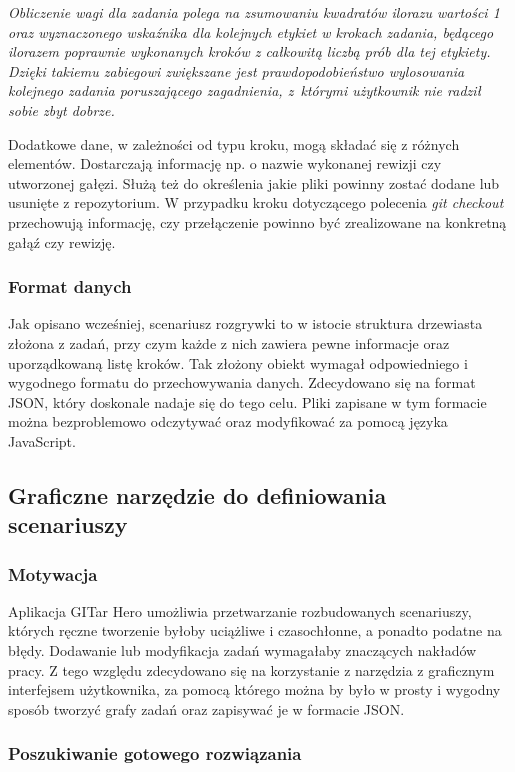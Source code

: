 \documentclass[11pt,a4paper,polish,thesis]{dcsbook}
\begin{document}
	\textit{Obliczenie wagi dla zadania polega na zsumowaniu kwadratów ilorazu wartości 1 oraz wyznaczonego wskaźnika dla kolejnych etykiet w krokach zadania, będącego ilorazem poprawnie wykonanych kroków z całkowitą liczbą prób dla tej etykiety. Dzięki takiemu zabiegowi zwiększane jest prawdopodobieństwo wylosowania kolejnego zadania poruszającego zagadnienia, z~którymi użytkownik nie radził sobie zbyt dobrze.}
	
	Dodatkowe dane, w zależności od typu kroku, mogą składać się z różnych elementów. Dostarczają informację np. o nazwie wykonanej rewizji czy utworzonej gałęzi. Służą też do określenia jakie pliki powinny zostać dodane lub usunięte z repozytorium. W przypadku kroku dotyczącego polecenia \textit{git checkout} przechowują informację, czy przełączenie powinno być zrealizowane na konkretną gałąź czy rewizję.
	
	\subsubsection{Format danych}
	
	Jak opisano wcześniej, scenariusz rozgrywki to w istocie struktura drzewiasta złożona z zadań, przy czym każde z nich zawiera pewne informacje oraz uporządkowaną listę kroków. Tak złożony obiekt wymagał odpowiedniego i wygodnego formatu do przechowywania danych. Zdecydowano się na format JSON, który doskonale nadaje się do tego celu. Pliki zapisane w tym formacie można bezproblemowo odczytywać oraz modyfikować za pomocą języka JavaScript.
	
	\subsection{Graficzne narzędzie do definiowania scenariuszy}
	
	\subsubsection{Motywacja}
	
	Aplikacja GITar Hero umożliwia przetwarzanie rozbudowanych scenariuszy, których ręczne tworzenie byłoby uciążliwe i  czasochłonne, a ponadto podatne na błędy. Dodawanie lub modyfikacja zadań wymagałaby znaczących nakładów pracy.
	Z tego względu zdecydowano się na korzystanie z narzędzia z graficznym interfejsem użytkownika, za pomocą którego można by było w prosty i wygodny sposób tworzyć grafy zadań oraz zapisywać je w formacie JSON. 
	
	\subsubsection{Poszukiwanie gotowego rozwiązania}
	
\end{document}
